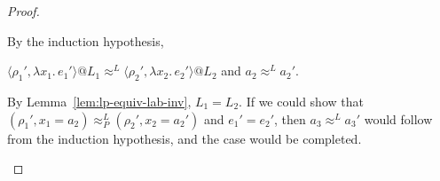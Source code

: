 \documentclass{article}
\makeatletter
\newcommand{\at}{\ensuremath{{\scriptstyle{@}}}}
\theoremstyle{definition}
\makeatother
\begin{document}
\begin{proof}
\begin{description}
    By the induction hypothesis,
    \begin{description}
    \item 
      $\langle{\rho_1', \lambda{x_1}.\, e_1'\rangle} \at L_1
      \approx^{L}
      \langle{\rho_2', \lambda{x_2}.\, e_2'\rangle} \at L_2$
      \quad and \quad
      $a_2 \approx^{L} a_2'$.
    \end{description}
    By Lemma~\ref{lem:lp-equiv-lab-inv}, $L_1 = L_2$.
    If we could show that
    $(\rho_1', x_1 = a_2) \approx^{L}_{P} (\rho_2', x_2 = a_2')$
    and $e_1' = e_2'$, then
    $a_3 \approx^{L} a_3'$ would follow from the induction hypothesis,
    and the case would be completed.
    \qedhere
  \end{description}
\end{proof}
\end{document}
